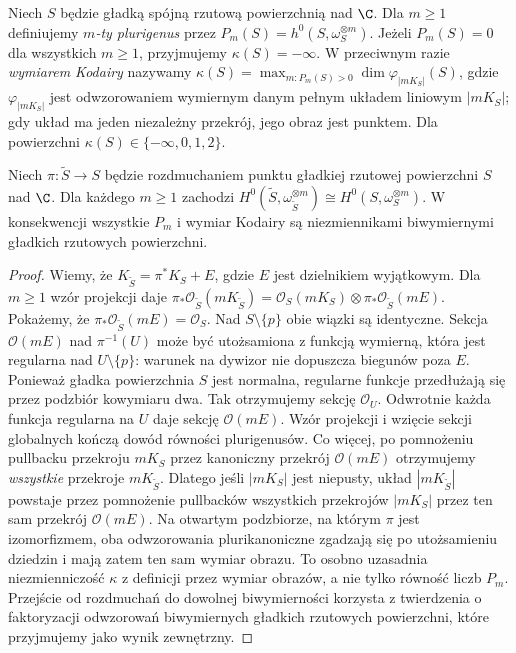 \begin{definicja}
\label{def:ga8-kodaira}
Niech $S$ będzie gładką spójną rzutową powierzchnią
nad $\C$. Dla $m\ge1$ definiujemy \emph{$m$-ty
plurigenus} przez $P_m(S)=h^0(S,\omega_S^{\otimes m})$.
Jeżeli $P_m(S)=0$ dla wszystkich $m\ge1$, przyjmujemy
$\kappa(S)=-\infty$. W przeciwnym razie
\emph{wymiarem Kodairy} nazywamy
$\kappa(S)=\max_{m:P_m(S)>0}\dim \varphi_{|mK_S|}(S)$,
gdzie $\varphi_{|mK_S|}$ jest odwzorowaniem wymiernym
danym pełnym układem liniowym $|mK_S|$; gdy układ
ma jeden niezależny przekrój, jego obraz jest punktem.
Dla powierzchni $\kappa(S)\in\{-\infty,0,1,2\}$.
\end{definicja}

\begin{stwierdzenie}
\label{st:ga8-plurigenera-blowup}
Niech $\pi:\widetilde S\to S$ będzie rozdmuchaniem
punktu gładkiej rzutowej powierzchni $S$ nad $\C$.
Dla każdego $m\ge1$ zachodzi
$H^0(\widetilde S,\omega_{\widetilde S}^{\otimes m})
\cong H^0(S,\omega_S^{\otimes m})$.
W konsekwencji wszystkie $P_m$ i wymiar Kodairy
są niezmiennikami biwymiernymi gładkich
rzutowych powierzchni.
\end{stwierdzenie}
\begin{proof}
Wiemy, że $K_{\widetilde S}=\pi^*K_S+E$,
gdzie $E$ jest dzielnikiem wyjątkowym. Dla $m\ge1$
wzór projekcji daje
$\pi_*\mathcal O_{\widetilde S}(mK_{\widetilde S})
=\mathcal O_S(mK_S)\otimes\pi_*\mathcal O_{\widetilde S}(mE)$.
Pokażemy, że $\pi_*\mathcal O_{\widetilde S}(mE)
=\mathcal O_S$. Nad $S\setminus\{p\}$ obie wiązki
są identyczne. Sekcja $\mathcal O(mE)$ nad
$\pi^{-1}(U)$ może być utożsamiona z funkcją wymierną,
która jest regularna nad $U\setminus\{p\}$:
warunek na dywizor nie dopuszcza biegunów poza $E$.
Ponieważ gładka powierzchnia $S$ jest normalna,
regularne funkcje przedłużają się przez podzbiór
kowymiaru dwa. Tak otrzymujemy sekcję $\mathcal O_U$.
Odwrotnie każda funkcja regularna na $U$ daje
sekcję $\mathcal O(mE)$. Wzór projekcji i wzięcie
sekcji globalnych kończą dowód równości plurigenusów.
Co więcej, po pomnożeniu pullbacku przekroju $mK_S$
przez kanoniczny przekrój $\mathcal O(mE)$ otrzymujemy
\emph{wszystkie} przekroje $mK_{\widetilde S}$. Dlatego
jeśli $|mK_S|$ jest niepusty, układ $|mK_{\widetilde S}|$
powstaje przez pomnożenie pullbacków wszystkich przekrojów
$|mK_S|$ przez ten sam przekrój $\mathcal O(mE)$.
Na otwartym podzbiorze, na którym $\pi$ jest izomorfizmem,
oba odwzorowania plurikanoniczne zgadzają się po utożsamieniu
dziedzin i mają zatem ten sam wymiar obrazu.
To osobno uzasadnia niezmienniczość $\kappa$ z definicji
przez wymiar obrazów, a nie tylko równość liczb $P_m$.
Przejście od rozdmuchań do dowolnej biwymierności
korzysta z twierdzenia o faktoryzacji odwzorowań
biwymiernych gładkich rzutowych powierzchni,
które przyjmujemy jako wynik zewnętrzny.
\end{proof}

